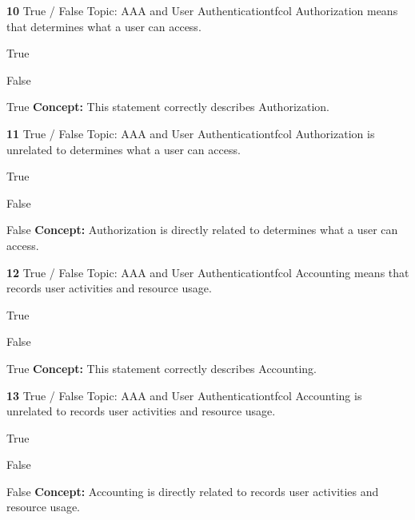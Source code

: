 \documentclass[10pt,a4paper]{article}
\begin{document}
\begin{qcard}{\color{white}\textbf{10} \hfill \small True / False \textbar{} Topic: AAA and User Authentication}{tfcol}
Authorization means that determines what a user can access.

\begin{qoptions}
\item True
\item False
\end{qoptions}
\begin{explainbox}{True}
\textbf{Concept:} This statement correctly describes Authorization.
\end{explainbox}
\end{qcard}

\begin{qcard}{\color{white}\textbf{11} \hfill \small True / False \textbar{} Topic: AAA and User Authentication}{tfcol}
Authorization is unrelated to determines what a user can access.

\begin{qoptions}
\item True
\item False
\end{qoptions}
\begin{explainbox}{False}
\textbf{Concept:} Authorization is directly related to determines what a user can access.
\end{explainbox}
\end{qcard}

\begin{qcard}{\color{white}\textbf{12} \hfill \small True / False \textbar{} Topic: AAA and User Authentication}{tfcol}
Accounting means that records user activities and resource usage.

\begin{qoptions}
\item True
\item False
\end{qoptions}
\begin{explainbox}{True}
\textbf{Concept:} This statement correctly describes Accounting.
\end{explainbox}
\end{qcard}

\begin{qcard}{\color{white}\textbf{13} \hfill \small True / False \textbar{} Topic: AAA and User Authentication}{tfcol}
Accounting is unrelated to records user activities and resource usage.

\begin{qoptions}
\item True
\item False
\end{qoptions}
\begin{explainbox}{False}
\textbf{Concept:} Accounting is directly related to records user activities and resource usage.
\end{explainbox}
\end{qcard}
\end{document}
